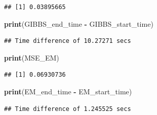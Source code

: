 \documentclass[12pt]{article}
\newenvironment{Shaded}{\begin{snugshade}}{\end{snugshade}}
\newcommand{\FunctionTok}[1]{\textcolor[rgb]{0.13,0.29,0.53}{\textbf{#1}}}
\newcommand{\NormalTok}[1]{#1}
\newcommand{\SpecialCharTok}[1]{\textcolor[rgb]{0.81,0.36,0.00}{\textbf{#1}}}
\begin{document}
\begin{verbatim}
## [1] 0.03895665
\end{verbatim}

\begin{Shaded}
\begin{Highlighting}[]
\FunctionTok{print}\NormalTok{(GIBBS\_end\_time }\SpecialCharTok{{-}}\NormalTok{ GIBBS\_start\_time)}
\end{Highlighting}
\end{Shaded}

\begin{verbatim}
## Time difference of 10.27271 secs
\end{verbatim}

\begin{Shaded}
\begin{Highlighting}[]
\FunctionTok{print}\NormalTok{(MSE\_EM)}
\end{Highlighting}
\end{Shaded}

\begin{verbatim}
## [1] 0.06930736
\end{verbatim}

\begin{Shaded}
\begin{Highlighting}[]
\FunctionTok{print}\NormalTok{(EM\_end\_time }\SpecialCharTok{{-}}\NormalTok{ EM\_start\_time)}
\end{Highlighting}
\end{Shaded}

\begin{verbatim}
## Time difference of 1.245525 secs
\end{verbatim}
\end{document}
